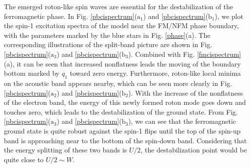 \documentclass[amsmath,superscriptaddress,showpacs,aps,prb,twocolumn]{revtex4-1}
\begin{document}
\par The emerged roton-like spin waves are essential for the destabilization of the ferromagnetic phase. In Fig. \ref{pbcispectrum}($\text{a}_1$) and \ref{pbcispectrum}($\text{b}_1$), we plot the spin-1 excitation spectra of the model near the FM/NFM phase boundary, with the parameters marked by the blue stars in Fig. \ref{phase}(a). The corresponding illustrations of the split-band picture are shown in Fig. \ref{pbcispectrum}($\text{a}_3$) and \ref{pbcispectrum}($\text{b}_3$). Combined with Fig. \ref{fmcispectrum}(a), it can be seen that increased nonflatness leads the moving of the boundary bottom marked by $q_1$ toward zero energy. Furthermore, roton-like local minima on the acoustic band appears nearby, which can be seen more clearly in Fig. \ref{pbcispectrum}($\text{a}_2$) and \ref{pbcispectrum}($\text{b}_2$). With the increase of the nonflatness of the electron band, the energy of this newly formed roton mode goes down and touches zero, which leads to the destabilization of the ground state. From Fig. \ref{pbcispectrum}($\text{a}_3$) and \ref{pbcispectrum}($\text{b}_3$), we can see that the ferromagnetic ground state is quite robust against the spin-1 flips until the top of the spin-up band is approaching near to the bottom of the spin-down band. Considering that the energy splitting of these two bands is $U/2$, the destabilization point would be quite close to $U/2\sim W$.
\end{document}

